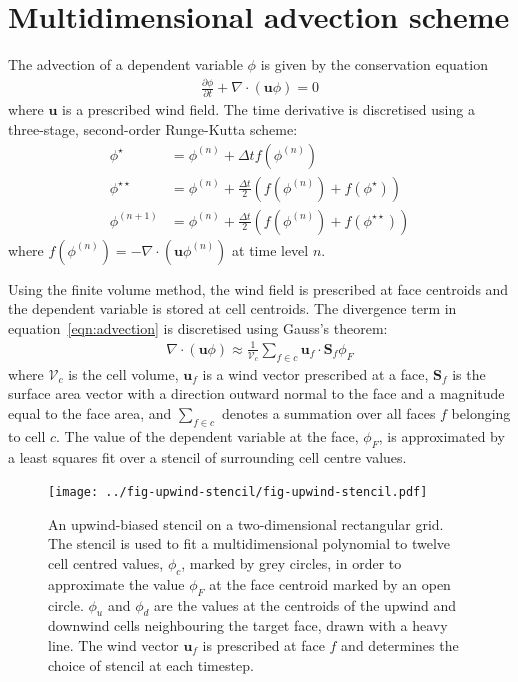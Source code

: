 \section{Multidimensional advection scheme}

The advection of a dependent variable $\phi$ is given by the conservation equation
\begin{align}
	\frac{\partial \phi}{\partial t} + \nabla \cdot \left( \mathbf{u} \phi \right) = 0 \label{eqn:advection}
\end{align}
where $\mathbf{u}$ is a prescribed wind field.  The time derivative is discretised using a three-stage, second-order Runge-Kutta scheme:
\begin{subequations}
\begin{align}
	\phi^\star &= \phi^{(n)} + \Delta t f(\phi^{(n)}) \\
	\phi^{\star\star} &= \phi^{(n)} + \frac{\Delta t}{2} \left( f(\phi^{(n)}) + f(\phi^\star) \right) \\
	\phi^{(n+1)} &= \phi^{(n)} + \frac{\Delta t}{2} \left( f(\phi^{(n)}) + f(\phi^{\star\star}) \right)
\end{align}
\end{subequations}
where \(f(\phi^{(n)}) = - \nabla \cdot (\mathbf{u} \phi^{(n)})\) at time level \(n\).

Using the finite volume method, the wind field is prescribed at face centroids and the dependent variable is stored at cell centroids.  The divergence term in equation~\eqref{eqn:advection} is discretised using Gauss's theorem:
\begin{align}
	\nabla \cdot \left( \mathbf{u} \phi \right) \approx \frac{1}{\mathcal{V}_c} \sum_{f \in c} \mathbf{u}_f \cdot \mathbf{S}_f \phi_F
\end{align}
where $\mathcal{V}_c$ is the cell volume, $\mathbf{u}_f$ is a wind vector prescribed at a face, ${\mathbf{S}_f}$ is the surface area vector with a direction outward normal to the face and a magnitude equal to the face area, and $\sum_{f \in c}$ denotes a summation over all faces $f$ belonging to cell $c$.  The value of the dependent variable at the face, $\phi_F$, is approximated by a least squares fit over a stencil of surrounding cell centre values.

\begin{figure}
	\centering
	\texttt{[image: ../fig-upwind-stencil/fig-upwind-stencil.pdf]}
	\caption{An upwind-biased stencil on a two-dimensional rectangular grid.  The stencil is used to fit a multidimensional polynomial to twelve cell centred values, $\phi_c$, marked by grey circles, in order to approximate the value $\phi_F$ at the face centroid marked by an open circle.  $\phi_u$ and $\phi_d$ are the values at the centroids of the upwind and downwind cells neighbouring the target face, drawn with a heavy line.  The wind vector $\mathbf{u}_f$ is prescribed at face $f$ and determines the choice of stencil at each timestep.}
	\label{fig:interiorQuadStencil}
\end{figure}

